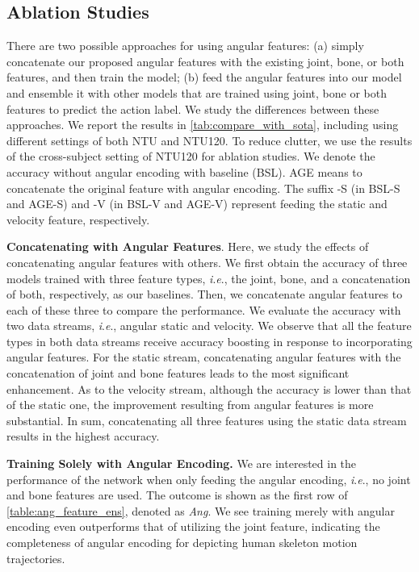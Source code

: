 \documentclass[journal,comsoc]{IEEEtran}
\newcommand{\ie}{\textit{i}.\textit{e}.,}
\begin{document}
\subsection{Ablation Studies}
There are two possible approaches for using angular features: (a) simply concatenate our proposed angular features with the existing joint, bone, or both features, and then train the model; (b) feed the angular features into our model and ensemble it with other models that are trained using joint, bone or both features to predict the action label. We study the differences between these approaches. We report the results in \autoref{tab:compare_with_sota}, including using different settings of both NTU and NTU120. To reduce clutter, we use the results of the cross-subject setting of NTU120 for ablation studies. 
We denote the accuracy without angular encoding with baseline (BSL). AGE means to concatenate the original feature with angular encoding. The suffix -S (in BSL-S and AGE-S) and -V (in BSL-V and AGE-V) represent feeding the static and velocity feature, respectively.

\textbf{Concatenating with Angular Features}. 
Here, we study the effects of concatenating angular features with others. We first obtain the accuracy of three models trained with three feature types, \ie{} the joint, bone, and a concatenation of both, respectively, as our baselines. Then, we concatenate angular features to each of these three to compare the performance. We evaluate the accuracy with two data streams, \ie{} angular static and velocity. 
We observe that all the feature types in both data streams receive accuracy boosting in response to incorporating angular features. For the static stream, concatenating angular features with the concatenation of joint and bone features leads to the most significant enhancement. As to the velocity stream, although the accuracy is lower than that of the static one, the improvement resulting from angular features is more substantial. In sum, concatenating all three features using the static data stream results in the highest accuracy.  

\textbf{Training Solely with Angular Encoding.}
We are interested in the performance of the network when only feeding the angular encoding, \ie{} no joint and bone features are used. The outcome is shown as the first row of \autoref{table:ang_feature_ens}, denoted as \emph{Ang}. We see training merely with angular encoding even outperforms that of utilizing the joint feature, indicating the completeness of angular encoding for depicting human skeleton motion trajectories. 
\end{document}
